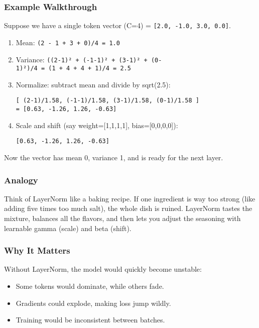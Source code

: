 \documentclass[
  letterpaper,
  DIV=11,
  numbers=noendperiod]{scrreprt}
\providecommand{\tightlist}{%
  \setlength{\itemsep}{0pt}\setlength{\parskip}{0pt}}
\begin{document}
\subsubsection{Example Walkthrough}\label{example-walkthrough-1}

Suppose we have a single token vector (C=4) =
\texttt{{[}2.0,\ -1.0,\ 3.0,\ 0.0{]}}.

\begin{enumerate}
\def\labelenumi{\arabic{enumi}.}
\item
  Mean: \texttt{(2\ -\ 1\ +\ 3\ +\ 0)/4\ =\ 1.0}
\item
  Variance:
  \texttt{((2-1)²\ +\ (-1-1)²\ +\ (3-1)²\ +\ (0-1)²)/4\ =\ (1\ +\ 4\ +\ 4\ +\ 1)/4\ =\ 2.5}
\item
  Normalize: subtract mean and divide by sqrt(2.5):

\begin{verbatim}
[ (2-1)/1.58, (-1-1)/1.58, (3-1)/1.58, (0-1)/1.58 ]
= [0.63, -1.26, 1.26, -0.63]
\end{verbatim}
\item
  Scale and shift (say weight={[}1,1,1,1{]}, bias={[}0,0,0,0{]}):

\begin{verbatim}
[0.63, -1.26, 1.26, -0.63]
\end{verbatim}
\end{enumerate}

Now the vector has mean 0, variance 1, and is ready for the next layer.

\subsubsection{Analogy}\label{analogy-1}

Think of LayerNorm like a baking recipe. If one ingredient is way too
strong (like adding five times too much salt), the whole dish is ruined.
LayerNorm tastes the mixture, balances all the flavors, and then lets
you adjust the seasoning with learnable gamma (scale) and beta (shift).

\subsubsection{Why It Matters}\label{why-it-matters-22}

Without LayerNorm, the model would quickly become unstable:

\begin{itemize}
\tightlist
\item
  Some tokens would dominate, while others fade.
\item
  Gradients could explode, making loss jump wildly.
\item
  Training would be inconsistent between batches.
\end{itemize}
\end{document}
